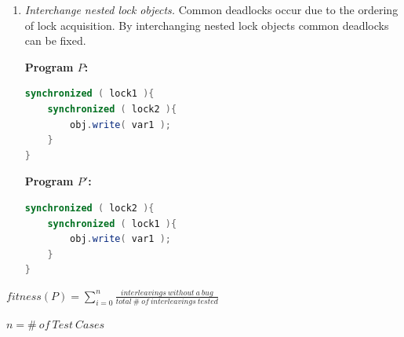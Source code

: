 \documentclass[10pt, conference, compsocconf]{IEEEtran}
\newcommand{\notesbox}[1]{
      \noindent\begin{center}\begin{boxedminipage}[h]{0.4\textwidth}{#1}\end{boxedminipage}\end{center}
}
\begin{document}
\begin{enumerate}
	\item \textit{Interchange nested lock objects.} Common deadlocks occur due to the ordering of lock acquisition. By interchanging nested lock objects common deadlocks can be fixed.

\vspace{2mm}
	\begin{minipage}{3.70cm}
\footnotesize{\textbf{ Program $P$:}}
\begin{lstlisting}[language=Java]
synchronized ( lock1 ){
	synchronized ( lock2 ){
		obj.write( var1 );
	}
}
\end{lstlisting}
\end{minipage}\hfill
\begin{minipage}{3.70cm}
\footnotesize{\textbf{ Program $P'$:}}
\begin{lstlisting}[language=Java]
synchronized ( lock2 ){
	synchronized ( lock1 ){
		obj.write( var1 );
	}
}
\end{lstlisting}
\end{minipage}

\end{enumerate}


\begin{footnotesize}
\begin{center}
$fitness(P) = \displaystyle\sum\limits_{i=0}^n\frac{interleavings\ without\ a\ bug}{total\ \#\ of\ interleavings\ tested}$
\end{center}
\end{footnotesize}
\begin{tiny}
\begin{center}
$n = \#\ of\ Test\ Cases$
\end{center}
\end{tiny}








%

\end{document}
